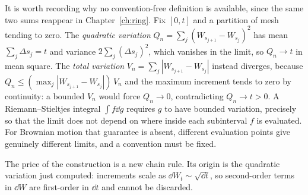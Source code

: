 It is worth recording why no convention-free definition is available, since
the same two sums reappear in Chapter~\ref{ch:ring}. Fix $[0,t]$ and a
partition of mesh tending to zero. The \emph{quadratic variation}
$Q_n = \sum_j (W_{s_{j+1}} - W_{s_j})^2$ has mean
$\sum_j \Delta s_j = t$ and variance $2\sum_j (\Delta s_j)^2$, which vanishes
in the limit, so $Q_n \to t$ in mean square. The \emph{total variation}
$V_n = \sum_j |W_{s_{j+1}} - W_{s_j}|$ instead diverges, because
$Q_n \le (\max_j |W_{s_{j+1}} - W_{s_j}|)\, V_n$ and the maximum increment
tends to zero by continuity: a bounded $V_n$ would force $Q_n \to 0$,
contradicting $Q_n \to t > 0$. A Riemann--Stieltjes integral $\int f \dd g$
requires $g$ to have bounded variation, precisely so that the limit does not
depend on where inside each subinterval $f$ is evaluated. For Brownian motion
that guarantee is absent, different evaluation points give genuinely different
limits, and a convention must be fixed.

The price of the construction is a new chain rule. Its origin is the
quadratic variation just computed: increments scale as
$\dd W_t \sim \sqrt{\dd t}$, so second-order terms in $\dd W$ are
first-order in $\dd t$ and cannot be discarded.

